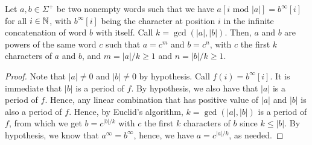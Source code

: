 \begin{lemma}\label{lem:word-theory}
    Let $a,b \in \Sigma^+$ be two nonempty words such that we have $a[i \text{ mod } |a|] = b^\infty [i]$ for all $i\in\mathbb{N}$, with $b^\infty [i]$ being the character at position $i$ in the infinite concatenation of word $b$ with itself. Call $k=\operatorname{gcd}(|a|,|b|)$. Then, $a$ and $b$ are powers of the same word $c$ such that $a = c^m$ and $b = c^n$, with $c$ the first $k$ characters of $a$ and $b$, and $m = |a|/k \geq 1$ and $n = |b|/k \geq 1$.
\end{lemma}
\begin{proof}
    Note that $|a| \neq 0$ and $|b| \neq 0$ by hypothesis. Call $f(i) = b^\infty[i]$. It is immediate that $|b|$ is a period of $f$. By hypothesis, we also have that $|a|$ is a period of $f$. Hence, any linear combination that has positive value of $|a|$ and $|b|$ is also a period of $f$. Hence, by Euclid's algorithm, $k=\operatorname{gcd}(|a|,|b|)$ is a period of $f$, from which we get $b = c^{|b|/k}$ with $c$ the first $k$ characters of $b$ since $k \leq |b|$. By hypothesis, we know that $a^{\infty} = b^{\infty}$, hence, we have $a = c^{|a|/k}$, as needed.


\end{proof}

